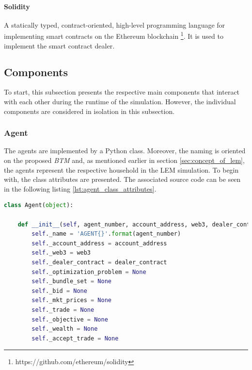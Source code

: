 \paragraph{Solidity}
A statically typed, contract-oriented, high-level programming language for implementing smart contracts on the Ethereum
blockchain \footnote{https://github.com/ethereum/solidity}.
It is used to implement the smart contract dealer. 

\clearpage
\subsection{Components}
\label{sec:components_of_simulation}
To start, this subsection presents the respective main components 
that interact with each other during the runtime of the simulation.
However, the individual components are considered in isolation in this subsection.

\subsubsection{Agent}
\label{sec:agent_class}
The agents are implemented by a Python class. Moreover, the naming is oriented on the proposed \textit{BTM} and,
as mentioned earlier in section \ref{sec:concept_of_lem}, the agents represent the respective household 
in the LEM simulation.
To begin with, the class attributes are presented. 
The associated source code can be seen in the following listing \ref{lst:agent_class_attributes}.

\begin{lstlisting}[label=lst:agent_class_attributes, caption=Overview of the agent class attributes, language=Python]
    class Agent(object):

    def __init__(self, agent_number, account_address, web3, dealer_contract):
        self._name = 'AGENT{}'.format(agent_number)
        self._account_address = account_address
        self._web3 = web3
        self._dealer_contract = dealer_contract
        self._optimization_problem = None
        self._bundle_set = None
        self._bid = None
        self._mkt_prices = None
        self._trade = None
        self._objective = None
        self._wealth = None
        self._accept_trade = None
\end{lstlisting}

